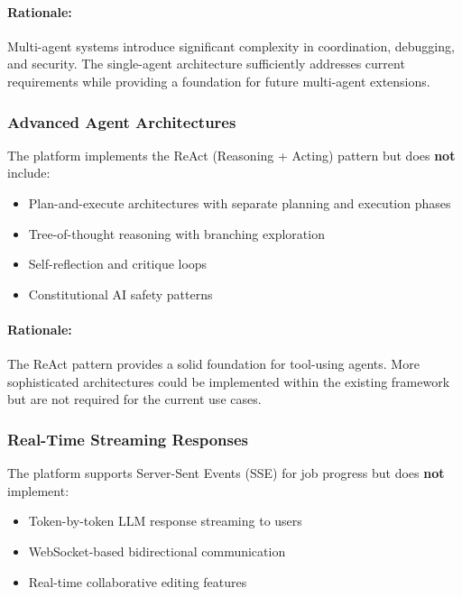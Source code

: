 \documentclass[a4paper,twoside]{sapthesis}
\begin{document}
\paragraph{Rationale:} Multi-agent systems introduce significant complexity in coordination, debugging, and security. The single-agent architecture sufficiently addresses current requirements while providing a foundation for future multi-agent extensions.

\subsubsection{Advanced Agent Architectures}

The platform implements the ReAct (Reasoning + Acting) pattern but does \textbf{not} include:

\begin{itemize}
    \item Plan-and-execute architectures with separate planning and execution phases
    \item Tree-of-thought reasoning with branching exploration
    \item Self-reflection and critique loops
    \item Constitutional AI safety patterns
\end{itemize}

\paragraph{Rationale:} The ReAct pattern provides a solid foundation for tool-using agents. More sophisticated architectures could be implemented within the existing framework but are not required for the current use cases.

\subsubsection{Real-Time Streaming Responses}

The platform supports Server-Sent Events (SSE) for job progress but does \textbf{not} implement:

\begin{itemize}
    \item Token-by-token LLM response streaming to users
    \item WebSocket-based bidirectional communication
    \item Real-time collaborative editing features
\end{itemize}
\end{document}
